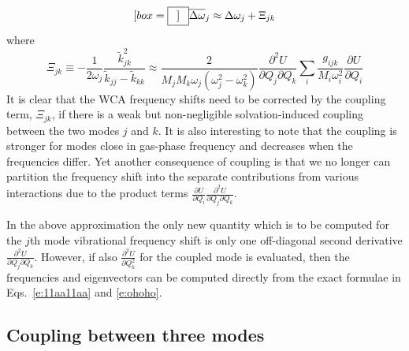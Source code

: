 \documentclass[a4paper,titlepage,twoside,fleqn,12pt]{book}
\newcommand*{\widebox}[2][0.5em]{\fbox{\hspace{#1}$\displaystyle #2$\hspace{#1}}}
\newcommand{\fderiv}[2]{\ensuremath{
\frac{\partial #1}{\partial #2}}}
\newcommand{\sderiv}[2]{\ensuremath{
\frac{\partial^2 #1}{\partial #2^2}
}}
\newcommand{\sderivd}[3]{\ensuremath{
\frac{\partial^2 #1}{\partial #2 \partial #3}
}}
\begin{document}
\begin{refsection}
\begin{equation}[box=\widebox]
   \overline{\Delta\omega}_j \approx \Delta\omega_j + \Xi_{jk}
\end{equation}
%
where
%
\begin{equation}
 \Xi_{jk} \equiv -\frac{1}{2\omega_j} \frac{\tilde{k}_{jk}^2}{\tilde{k}_{jj} - \tilde{k}_{kk}}
 \approx \frac{2}{M_jM_k\omega_j\left(\omega_j^2 - \omega_k^2\right)} \sderivd{U}{Q_j}{Q_k}
 \sum_i \frac{g_{ijk}}{M_i\omega_i^2}  \fderiv{U}{Q_i}  
\end{equation}
%
It is clear that the WCA frequency shifts need to be corrected
by the coupling term, $\Xi_{jk}$, if there 
is a weak but non\hyp{}negligible solvation\hyp{}induced coupling 
between the two modes $j$ and $k$. It is also interesting
to note that the coupling is stronger for modes close in gas\hyp{}phase
frequency
and decreases when the frequencies differ. 
Yet another consequence of coupling is that 
we no longer can partition the frequency shift into the
separate contributions from various interactions due to the
product terms $\fderiv{U}{Q_i}\sderivd{U}{Q_j}{Q_k}$.

In the above approximation the only new quantity which is to
be computed for the $j$th mode vibrational frequency shift 
is only one off\hyp{}diagonal second derivative $\sderivd{U}{Q_j}{Q_k}$.
However, if also $\sderiv{U}{Q_k}$ for the coupled mode
is evaluated, then the frequencies and eigenvectors can be computed
directly from the exact formulae in Eqs.~\eqref{e:11aa11aa}
and \eqref{e:ohoho}.



\subsection{Coupling between three modes}


\end{refsection}
\end{document}
